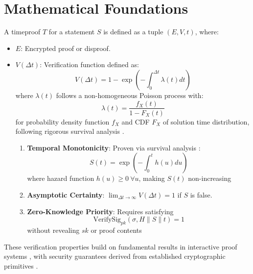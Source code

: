 \documentclass[12pt]{report}
\begin{document}
\section{Mathematical Foundations}

A timeproof \( T \) for a statement \( S \) is defined as a tuple \( (E, V, t) \), where:

\begin{itemize}
    \item \( E \): Encrypted proof or disproof.
    \item \( V(\Delta t) \): Verification function defined as:
    \begin{equation*}
        V(\Delta t) = 1 - \exp\left(-\int_0^{\Delta t} \lambda(t) dt\right)
    \end{equation*}
    where $\lambda(t)$ follows a non-homogeneous Poisson process with:
    \begin{equation*}
        \lambda(t) = \frac{f_X(t)}{1 - F_X(t)}
    \end{equation*}
    for probability density function $f_X$ and CDF $F_X$ of solution time distribution, following rigorous survival analysis \cite{AndersenBorgan1997}.
    \begin{enumerate}
        \item \textbf{Temporal Monotonicity}: Proven via survival analysis \cite{Kleinbaum2012}:
        \begin{equation*}
            S(t) = \exp\left(-\int_0^t h(u)du\right)
        \end{equation*}
        where hazard function $h(u) \geq 0\ \forall u$, making $S(t)$ non-increasing
        \item \textbf{Asymptotic Certainty}: \( \lim_{\Delta t \to \infty} V(\Delta t) = 1 \) if \( S \) is false.
        \item \textbf{Zero-Knowledge Priority}: Requires satisfying
        \begin{equation*}
            \text{VerifySig}_{pk}(\sigma, H \parallel S \parallel t) = 1
        \end{equation*}
        without revealing $sk$ or proof contents
    \end{enumerate}
\end{itemize}

These verification properties build on fundamental results in interactive proof systems \cite{Shamir1992}, with security guarantees derived from established cryptographic primitives \cite{BlumEtAl1986,ChaumEtAl1988}.
\end{document}

